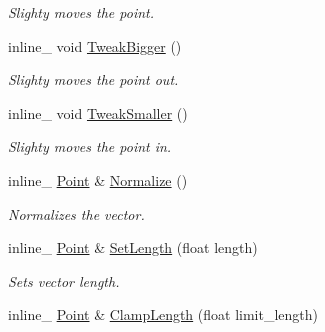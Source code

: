 \begin{DoxyCompactItemize}
\begin{DoxyCompactList}\small\item\em Slighty moves the point. \end{DoxyCompactList}\item 
\hypertarget{class_point_a02a06a034d405f8d043c347b3c390339}{inline\+\_\+ void \hyperlink{class_point_a02a06a034d405f8d043c347b3c390339}{Tweak\+Bigger} ()}\label{class_point_a02a06a034d405f8d043c347b3c390339}

\begin{DoxyCompactList}\small\item\em Slighty moves the point out. \end{DoxyCompactList}\item 
\hypertarget{class_point_a32670367f5b97b83cc062d90fb5f551f}{inline\+\_\+ void \hyperlink{class_point_a32670367f5b97b83cc062d90fb5f551f}{Tweak\+Smaller} ()}\label{class_point_a32670367f5b97b83cc062d90fb5f551f}

\begin{DoxyCompactList}\small\item\em Slighty moves the point in. \end{DoxyCompactList}\item 
\hypertarget{class_point_afe1bb2bb5081371fe58ba6a0835b14dc}{inline\+\_\+ \hyperlink{class_point}{Point} \& \hyperlink{class_point_afe1bb2bb5081371fe58ba6a0835b14dc}{Normalize} ()}\label{class_point_afe1bb2bb5081371fe58ba6a0835b14dc}

\begin{DoxyCompactList}\small\item\em Normalizes the vector. \end{DoxyCompactList}\item 
\hypertarget{class_point_ae93aefb6d3b029526eea4c9d814c7900}{inline\+\_\+ \hyperlink{class_point}{Point} \& \hyperlink{class_point_ae93aefb6d3b029526eea4c9d814c7900}{Set\+Length} (float length)}\label{class_point_ae93aefb6d3b029526eea4c9d814c7900}

\begin{DoxyCompactList}\small\item\em Sets vector length. \end{DoxyCompactList}\item 
\hypertarget{class_point_a598f4dc4c6b260340c0c7ebc5bdefe03}{inline\+\_\+ \hyperlink{class_point}{Point} \& \hyperlink{class_point_a598f4dc4c6b260340c0c7ebc5bdefe03}{Clamp\+Length} (float limit\+\_\+length)}\label{class_point_a598f4dc4c6b260340c0c7ebc5bdefe03}


\end{DoxyCompactItemize}
